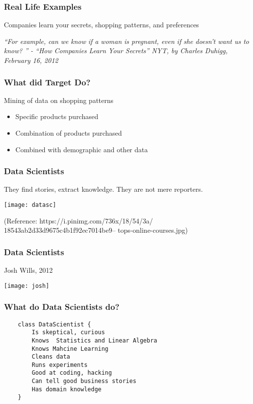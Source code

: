 \begin{frame}[fragile]\frametitle{Real Life Examples}
Companies learn your secrets, shopping patterns, and preferences

\begin{center}
{\em ``For example, can we know if a woman is pregnant, even if she doesn't want us to know? 
'' - ``How Companies Learn Your Secrets'' NYT, by Charles Duhigg, February 16, 2012
}
\end{center}
\end{frame}

\begin{frame}[fragile]\frametitle{What did Target Do?}
Mining of data on shopping patterns

\begin{itemize}
\item Specific products purchased
\item Combination of products purchased
\item Combined with demographic and other data
\end{itemize}
\end{frame}


\begin{frame}[fragile]\frametitle{Data Scientists}
They find stories, extract knowledge. They are not mere reporters.
\begin{center}
\texttt{[image: datasc]}
\end{center}
\tiny{(Reference: https://i.pinimg.com/736x/18/54/3a/ 18543ab2d33d9675c4b1f92ec7014be9-- tops-online-courses.jpg)}
\end{frame}

\begin{frame}[fragile]\frametitle{Data Scientists}
Josh Wills, 2012
\begin{center}
\texttt{[image: josh]}
\end{center}
\end{frame}

\begin{frame}[fragile]\frametitle{What do Data Scientists do?}
\begin{lstlisting}
	class DataScientist {
		Is skeptical, curious
		Knows  Statistics and Linear Algebra
		Knows Mahcine Learning
		Cleans data
		Runs experiments
		Good at coding, hacking
		Can tell good business stories
		Has domain knowledge
	}
\end{lstlisting}
\end{frame}

